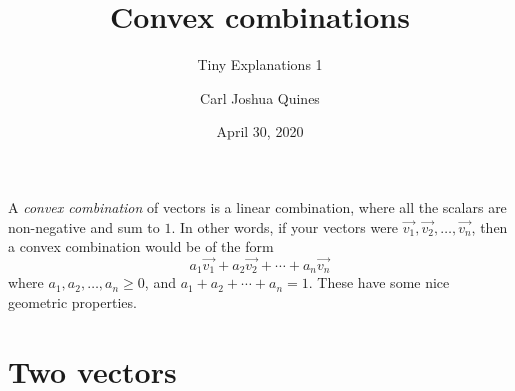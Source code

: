 \documentclass[11pt,paper=letter]{scrartcl}
\begin{document}
\title{Convex combinations}
\subtitle{Tiny Explanations 1}
\author{Carl Joshua Quines}
\date{April 30, 2020}

\maketitle

A \textit{convex combination} of vectors is a linear combination, where all the scalars are non-negative and sum to $1$. In other words, if your vectors were $\vec{v_1}, \vec{v_2}, \ldots, \vec{v_n}$, then a convex combination would be of the form \[
  a_1\vec{v_1} + a_2\vec{v_2} + \cdots + a_n\vec{v_n}
\]
where $a_1, a_2, \ldots, a_n \ge 0$, and $a_1 + a_2 + \cdots + a_n = 1$. These have some nice geometric properties.

\section{Two vectors}
\end{document}
